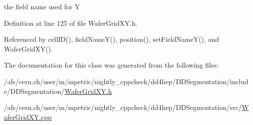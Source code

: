 the field name used for Y 



Definition at line 125 of file Wafer\+Grid\+X\+Y.\+h.



Referenced by cell\+I\+D(), field\+Name\+Y(), position(), set\+Field\+Name\+Y(), and Wafer\+Grid\+X\+Y().



The documentation for this class was generated from the following files\+:\begin{DoxyCompactItemize}
\item 
/afs/cern.\+ch/user/m/mpetric/nightly\+\_\+cppcheck/dd4hep/\+D\+D\+Segmentation/include/\+D\+D\+Segmentation/\hyperlink{_d_d_segmentation_2include_2_d_d_segmentation_2_wafer_grid_x_y_8h}{Wafer\+Grid\+X\+Y.\+h}\item 
/afs/cern.\+ch/user/m/mpetric/nightly\+\_\+cppcheck/dd4hep/\+D\+D\+Segmentation/src/\hyperlink{_d_d_segmentation_2src_2_wafer_grid_x_y_8cpp}{Wafer\+Grid\+X\+Y.\+cpp}\end{DoxyCompactItemize}
